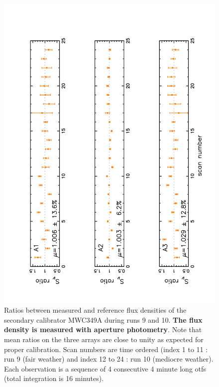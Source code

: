 \begin{figure}[p]
\begin{center}
  \includegraphics[clip, angle=-90, scale=0.6]{Figures/Ratio_vs_index_MWC349_r9_r10_Ap.pdf}
  \caption{Ratios between measured and reference flux densities of  the secondary calibrator  MWC349A
    during runs 9 and 10.  {\bf The flux density is measured with aperture photometry}. Note that mean ratios
    on the three arrays are close to unity as expected for proper calibration.
    Scan numbers are time ordered (index 1 to 11 : run 9 (fair weather) and index 12 to 24 : run 10 (mediocre weather).
    Each observation is a sequence of 4 consecutive 4 minute long otfs (total integration is 16 minutes).
  }
\label{fig:ratio_349_Ap}
\end{center}
\end{figure}



